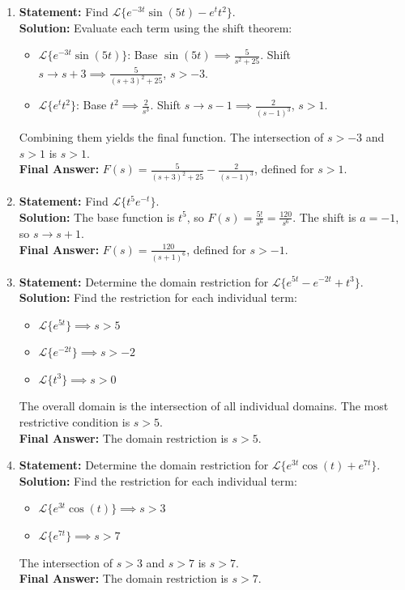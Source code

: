 \documentclass[11pt, letterpaper]{article}
\theoremstyle{definition}
\theoremstyle{remark}
\begin{document}
\begin{enumerate}[label=\textbf{Solution \arabic*.}, leftmargin=*]
    \item \textbf{Statement:} Find $\mathscr{L}\{e^{-3t}\sin(5t) - e^{t}t^2\}$.\\
    \textbf{Solution:} Evaluate each term using the shift theorem:
    \begin{itemize}
        \item $\mathscr{L}\{e^{-3t}\sin(5t)\}$: Base $\sin(5t) \implies \frac{5}{s^2+25}$. Shift $s \to s+3 \implies \frac{5}{(s+3)^2+25}$, $s > -3$.
        \item $\mathscr{L}\{e^{t}t^2\}$: Base $t^2 \implies \frac{2}{s^3}$. Shift $s \to s-1 \implies \frac{2}{(s-1)^3}$, $s > 1$.
    \end{itemize}
    Combining them yields the final function. The intersection of $s > -3$ and $s > 1$ is $s > 1$.\\
    \textbf{Final Answer:} $F(s) = \frac{5}{(s+3)^2+25} - \frac{2}{(s-1)^3}$, defined for $s > 1$.

    \item \textbf{Statement:} Find $\mathscr{L}\{t^5 e^{-t}\}$.\\
    \textbf{Solution:} The base function is $t^5$, so $F(s) = \frac{5!}{s^6} = \frac{120}{s^6}$. The shift is $a = -1$, so $s \to s+1$.\\
    \textbf{Final Answer:} $F(s) = \frac{120}{(s+1)^6}$, defined for $s > -1$.

    \item \textbf{Statement:} Determine the domain restriction for $\mathscr{L}\{e^{5t} - e^{-2t} + t^3\}$.\\
    \textbf{Solution:} Find the restriction for each individual term:
    \begin{itemize}
        \item $\mathscr{L}\{e^{5t}\} \implies s > 5$
        \item $\mathscr{L}\{e^{-2t}\} \implies s > -2$
        \item $\mathscr{L}\{t^3\} \implies s > 0$
    \end{itemize}
    The overall domain is the intersection of all individual domains. The most restrictive condition is $s > 5$.\\
    \textbf{Final Answer:} The domain restriction is $s > 5$.

    \item \textbf{Statement:} Determine the domain restriction for $\mathscr{L}\{e^{3t}\cos(t) + e^{7t}\}$.\\
    \textbf{Solution:} Find the restriction for each individual term:
    \begin{itemize}
        \item $\mathscr{L}\{e^{3t}\cos(t)\} \implies s > 3$
        \item $\mathscr{L}\{e^{7t}\} \implies s > 7$
    \end{itemize}
    The intersection of $s > 3$ and $s > 7$ is $s > 7$.\\
    \textbf{Final Answer:} The domain restriction is $s > 7$.


\end{enumerate}
\end{document}
